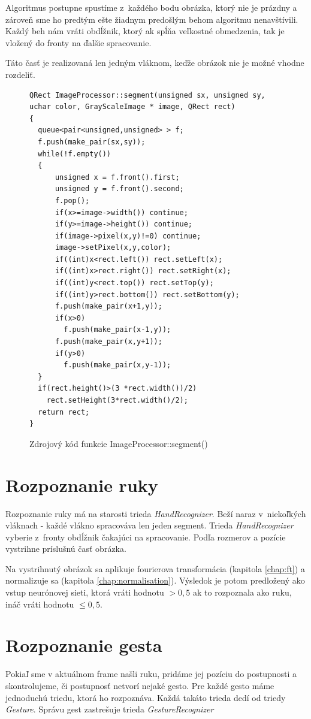 Algoritmus postupne spustíme z~každého bodu obrázka, ktorý nie je prázdny a zároveň sme ho predtým ešte žiadnym predošlým behom algoritmu nenavštívili. Každý beh nám vráti obdĺžnik, ktorý ak spĺňa veľkostné obmedzenia, tak je vložený do fronty na ďalšie spracovanie. 

Táto časť je realizovaná len jedným vláknom, keďže obrázok nie je možné vhodne rozdeliť.

\begin{figure}[htp]
\begin{lstlisting}
QRect ImageProcessor::segment(unsigned sx, unsigned sy, uchar color, GrayScaleImage * image, QRect rect)
{
  queue<pair<unsigned,unsigned> > f;
  f.push(make_pair(sx,sy));
  while(!f.empty())
  {
      unsigned x = f.front().first;
      unsigned y = f.front().second;
      f.pop();
      if(x>=image->width()) continue;
      if(y>=image->height()) continue;
      if(image->pixel(x,y)!=0) continue;
      image->setPixel(x,y,color);
      if((int)x<rect.left()) rect.setLeft(x);
      if((int)x>rect.right()) rect.setRight(x);
      if((int)y<rect.top()) rect.setTop(y);
      if((int)y>rect.bottom()) rect.setBottom(y);
      f.push(make_pair(x+1,y));
      if(x>0)
        f.push(make_pair(x-1,y));
      f.push(make_pair(x,y+1));
      if(y>0)
        f.push(make_pair(x,y-1));
  }
  if(rect.height()>(3 *rect.width())/2)
    rect.setHeight(3*rect.width()/2);
  return rect;
}
\end{lstlisting}
\caption{Zdrojový kód funkcie ImageProcessor::segment()}
\label{fig:segment}
\end{figure}

\section{Rozpoznanie ruky}

Rozpoznanie ruky má na starosti trieda \textit{HandRecognizer}. Beží naraz v~niekoľkých vláknach - každé vlákno spracováva len jeden segment.
Trieda \textit{HandRecognizer} vyberie z~fronty obdĺžnik čakajúci na spracovanie. Podľa rozmerov a pozície vystrihne príslušnú časť obrázka.

Na vystrihnutý obrázok sa aplikuje fourierova transformácia (kapitola \ref{chap:ft}) a normalizuje sa (kapitola \ref{chap:normalisation}). Výsledok je potom predložený ako vstup neurónovej sieti, ktorá vráti hodnotu $>0,5$ ak to rozpoznala ako ruku, ináč vráti hodnotu $\leq 0,5$. 

\section{Rozpoznanie gesta}
Pokiaľ sme v aktuálnom frame našli ruku, pridáme jej pozíciu do postupnosti a skontrolujeme, či postupnosť netvorí nejaké gesto. Pre každé gesto máme jednoduchú triedu, ktorá ho rozpoznáva. Každá takáto trieda dedí od triedy \textit{Gesture}. Správu gest zastrešuje trieda \textit{GestureRecognizer}

